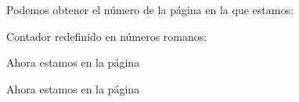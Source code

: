 \documentclass{article}
\begin{document}
Podemos obtener el número de la página en la que estamos: \thepage  %

\renewcommand{\thepage}{}
Contador redefinido en números romanos: \thepage  %

\setcounter{page}{3}
Ahora estamos en la página \thepage  %

\addtocounter{page}{6}
Ahora estamos en la página \thepage  %


\iffalse
\newcounter{Contador}[Contador existente]

El parámero de contador existente es opcional. Sirve para subordinar Contador
a otro contador existente. Por ejemplo, el contador subsection está subordinado
al contador section de tal forma que si el contador section se incrementa en 1
el contador subsection se reinicia automáticamente.

Al crear Contador se crea el comando \theContador con la definición \arabic{Contador}
por defecto.
\fi
\end{document}
